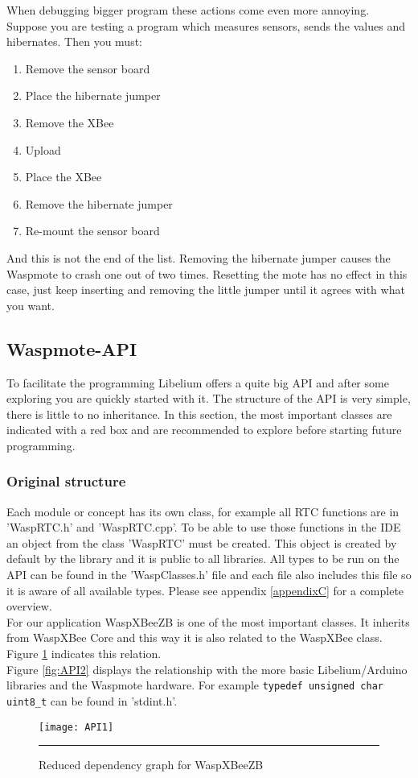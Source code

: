 When debugging bigger program these actions come even more annoying. Suppose you are testing a program which measures sensors, sends the values and hibernates. Then you must:
\begin{enumerate}
\item Remove the sensor board
\item Place the hibernate jumper
\item Remove the XBee
\item Upload
\item Place the XBee
\item Remove the hibernate jumper
\item Re-mount the sensor board
\end{enumerate}
And this is not the end of the list. Removing the hibernate jumper causes the Waspmote to crash one out of two times. Resetting the mote has no effect in this case, just keep inserting and removing the little jumper until it agrees with what you want.
\subsection{Waspmote-API}
To facilitate the programming Libelium offers a quite big API and after some exploring you are quickly started with it. The structure of the API is very simple, there is little to no inheritance. In this section, the most important classes are indicated with a red box and are recommended to explore before starting future programming.
\subsubsection{Original structure}
Each module or concept has its own class, for example all RTC functions are in 'WaspRTC.h' and 'WaspRTC.cpp'. To be able to use those functions in the IDE an object from the class 'WaspRTC' must be created. This object is created by default by the library and it is public to all libraries. All types to be run on the API can be found in the 'WaspClasses.h' file and each file also includes this file so it is aware of all available types. Please see appendix \ref{appendixC} for a complete overview.\\
For our application WaspXBeeZB is one of the most important classes. It inherits from WaspXBee Core and this way it is also related to the WaspXBee class. Figure \ref{fig:API1} indicates this relation.\\
Figure \ref{fig:API2} displays the relationship with the more basic Libelium/Arduino libraries and the Waspmote hardware. For example \verb+typedef unsigned char uint8_t+ can be found in 'stdint.h'.\\ 
\begin{figure}[ht]
\centering
\texttt{[image: API1]}
\rule{30em}{0.5pt}
\caption{Reduced dependency graph for WaspXBeeZB}
\label{fig:API1}
\end{figure}

